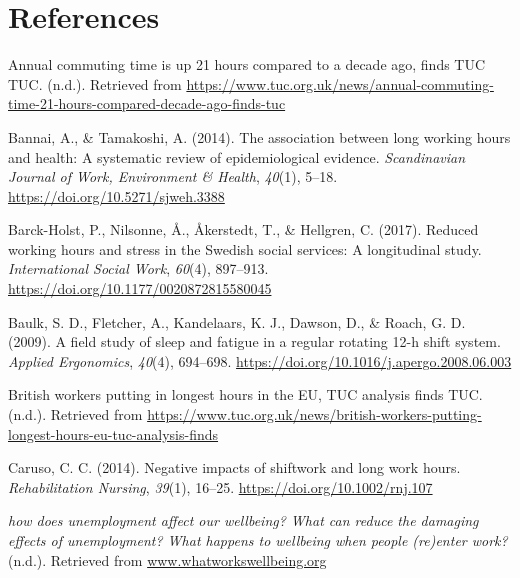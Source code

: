 \documentclass[
  english,
  man]{apa6}
\newlength{\cslhangindent}
\newenvironment{cslreferences}%
  {\setlength{\parindent}{0pt}%
  \everypar{\setlength{\hangindent}{\cslhangindent}}\ignorespaces}%
  {\par}
\begin{document}
\newpage

\hypertarget{references}{%
\section{References}\label{references}}

\begingroup
\setlength{\parindent}{-0.5in}
\setlength{\leftskip}{0.5in}

\hypertarget{refs}{}
\begin{cslreferences}
\leavevmode\hypertarget{ref-TUC2}{}%
Annual commuting time is up 21 hours compared to a decade ago, finds TUC \textbar{} TUC. (n.d.). Retrieved from \url{https://www.tuc.org.uk/news/annual-commuting-time-21-hours-compared-decade-ago-finds-tuc}

\leavevmode\hypertarget{ref-Bannai2014}{}%
Bannai, A., \& Tamakoshi, A. (2014). The association between long working hours and health: A systematic review of epidemiological evidence. \emph{Scandinavian Journal of Work, Environment \& Health}, \emph{40}(1), 5--18. \url{https://doi.org/10.5271/sjweh.3388}

\leavevmode\hypertarget{ref-Barck-Holst2017}{}%
Barck-Holst, P., Nilsonne, Å., Åkerstedt, T., \& Hellgren, C. (2017). Reduced working hours and stress in the Swedish social services: A longitudinal study. \emph{International Social Work}, \emph{60}(4), 897--913. \url{https://doi.org/10.1177/0020872815580045}

\leavevmode\hypertarget{ref-Baulk2009}{}%
Baulk, S. D., Fletcher, A., Kandelaars, K. J., Dawson, D., \& Roach, G. D. (2009). A field study of sleep and fatigue in a regular rotating 12-h shift system. \emph{Applied Ergonomics}, \emph{40}(4), 694--698. \url{https://doi.org/10.1016/j.apergo.2008.06.003}

\leavevmode\hypertarget{ref-TUC1}{}%
British workers putting in longest hours in the EU, TUC analysis finds \textbar{} TUC. (n.d.). Retrieved from \url{https://www.tuc.org.uk/news/british-workers-putting-longest-hours-eu-tuc-analysis-finds}

\leavevmode\hypertarget{ref-Caruso2014}{}%
Caruso, C. C. (2014). Negative impacts of shiftwork and long work hours. \emph{Rehabilitation Nursing}, \emph{39}(1), 16--25. \url{https://doi.org/10.1002/rnj.107}

\leavevmode\hypertarget{ref-WhatWorksWellbeing2}{}%
\emph{how does unemployment affect our wellbeing? What can reduce the damaging effects of unemployment? What happens to wellbeing when people (re)enter work?} (n.d.). Retrieved from \url{www.whatworkswellbeing.org}


\end{cslreferences}
\end{document}
